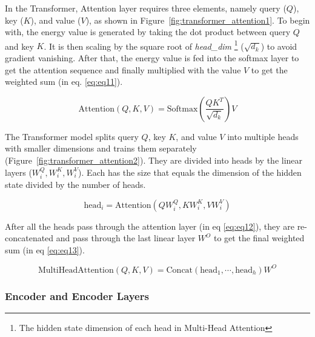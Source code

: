 In the Transformer, Attention layer requires three elements, namely query ($Q$), key ($K$), and value ($V$), as shown in Figure~\ref{fig:transformer_attention1}. To begin with, the energy value is generated by taking the dot product between query $Q$ and key $K$. It is then scaling by the square root of \textit{head\_dim} \footnote{The hidden state dimension of each head in Multi-Head Attention} ($\sqrt{d_k}$) to avoid gradient vanishing. After that, the energy value is fed into the softmax layer to get the attention sequence and finally multiplied with the value $V$ to get the weighted sum (in eq. \ref{eq:eq11}).

\begin{equation}
\text{Attention}(Q, K, V) = \text{Softmax}\left(\frac{QK^T}{\sqrt{d_k}}\right)V \label{eq:eq11}
\end{equation}

The Transformer model splits query $Q$, key $K$, and value $V$ into multiple heads with smaller dimensions and trains them separately (Figure~\ref{fig:transformer_attention2}). They are divided into heads by the linear layers ($W_i^Q, W_i^K, W_i^V$). Each has the size that equals the dimension of the hidden state divided by the number of heads. 

\begin{equation}
\text{head}_i = \text{Attention}(QW_i^Q, KW_i^K, VW_i^V) \label{eq:eq12}
\end{equation}

After all the heads pass through the attention layer (in eq \ref{eq:eq12}), they are re-concatenated and pass through the last linear layer $W^O$ to get the final weighted sum (in eq \ref{eq:eq13}).

\begin{equation}
\text{MultiHeadAttention}(Q, K, V) = \text{Concat}(\text{head}_1, \cdots, \text{head}_h)W^O
\label{eq:eq13}
\end{equation}

\subsubsection{Encoder and Encoder Layers}

